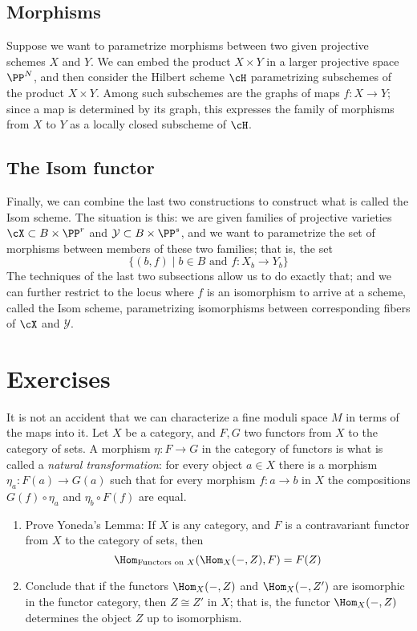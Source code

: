 \subsection{Morphisms} Suppose we want to parametrize morphisms between two given projective schemes $X$ and $Y$. We can embed the product $X \times Y$ in a larger projective space $\PP^N$, and then consider the Hilbert scheme $\cH$ parametrizing subschemes of the product $X \times Y$. Among such subschemes are the graphs of maps $f: X \to Y$; since a map is determined by its graph, this expresses the family of morphisms from $X$ to $Y$ as a locally closed subscheme of $\cH$.

\subsection{The Isom functor}
Finally, we can combine the last two constructions to construct what is called the Isom scheme. The situation is this: we are given families of projective varieties $\cX \subset B \times \PP^r$ and $\mathcal{Y} \subset B\times \PP^s$, and we want to parametrize the set of morphisms between members of these two families; that is, the set
$$
\{ (b, f) \mid b \in B \text{ and } f: X_b \to Y_b \}
$$
The techniques of the last two subsections allow us to do exactly that; and we can further restrict to the locus where $f$ is an isomorphism to arrive at a scheme, called the Isom scheme, parametrizing isomorphisms between corresponding fibers of $\cX$ and $\mathcal Y$.




\section{Exercises}

\begin{exercise}
It is not an accident that we can characterize a fine moduli space $M$ in terms of the maps into it. 
 Let $X$ be a category, and $F,G$ two functors from $X$ to the category of sets.
 A morphism $\eta: F\to G$ in the category of functors is what is called a \emph{natural transformation}:
 for every object $a\in X$ there is a morphism $\eta_a:F(a) \to G(a)$ such that for every
 morphism $f: a\to b$ in $X$ the compositions $G(f)\circ \eta_a$ and $\eta_b\circ F(f)$
 are equal. 
\begin{enumerate}
 \item Prove Yoneda's Lemma: If $X$ is any category, and $F$ is a contravariant functor from $X$ to the category of sets, then 
 $$
 \Hom_{\hbox{\scriptsize Functors on $X$}}(\Hom_X( -, Z), F) = F(Z)
 $$
 \item Conclude that if the functors $\Hom_X( -, Z)$ and $\Hom_X( -, Z')$ are isomorphic in the functor category, 
 then $Z \cong Z'$ in $X$; that is, the functor $\Hom_X( -, Z)$ determines the object $Z$ up to isomorphism.
 \end{enumerate}
\end{exercise}

